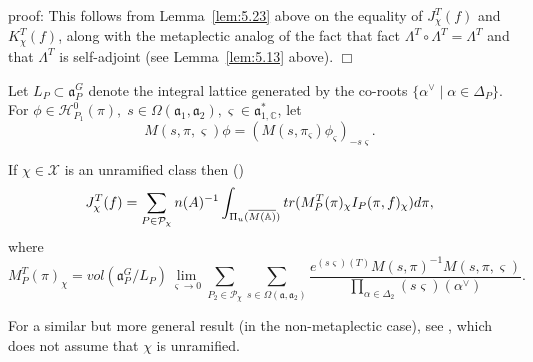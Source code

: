 proof: This follows from Lemma~\ref{lem:5.23} above on the
equality of $J_\chi ^T(f)$ and $K_\chi ^T(f)$, along with the
metaplectic analog of the fact that
fact $\Lambda^T\circ \Lambda ^T=\Lambda ^T$
\cite[Corollary 1.2]{A3} and that $\Lambda ^T$ is
self-adjoint \cite[Lemma 1.3]{A3} (see Lemma~\ref{lem:5.13} above). $\Box $

Let $L_P\subset {{\mathfrak{a}}}_P^G$ denote the integral
lattice generated by the
co-roots $\{\alpha ^{\vee }\;|\;\alpha \in \Delta _P\}$. For $\phi \in 
{\mathcal{H}}_{P_1}^0(\pi ),
\;s\in \Omega ({{\mathfrak{a}}}_1,{{\mathfrak{a}}}_2),\varsigma
\in {{\mathfrak{a}}}_{1,\mathbb{C}}^{*}$, let 
\[
M(s,\pi ,\varsigma )\phi =(M(s,\pi _\varsigma )\phi _\varsigma
)_{-s\varsigma }. 
\]
\begin{theorem}\label{thm:5.27}
If $\chi \in \mathcal{X}$ is an unramified class then (\cite[section 4]{A3}) 
\[
J_\chi ^T(f)=\sum_{P\in \mathcal{P}_\chi }
n(A)^{-1}\int_{\Pi _u(\overline{M(\mathbb{A} )})}
tr(M_P^T(\pi )_\chi I_P(\pi ,f)_\chi )d\pi ,
\]
where 
\[
M_P^T(\pi )_\chi =vol({{\mathfrak{a}}}_P^G/L_P)\lim_{\varsigma \rightarrow
0}\sum_{P_2\in \mathcal{P}_\chi }
\sum_{s\in \Omega ({{\mathfrak{a}}},{{\mathfrak{a}}}_2)}
\frac{e^{(s\varsigma )(T)}M(s,\pi )^{-1}M(s,\pi ,\varsigma )}{\prod_{\alpha
\in \Delta _2}(s\varsigma )(\alpha ^{\vee })}.
\]
\end{theorem}

For a similar but more general result (in the non-metaplectic case),
see \cite[Theorem 8.2]{A14}, which does not assume that $\chi$ is unramified.

